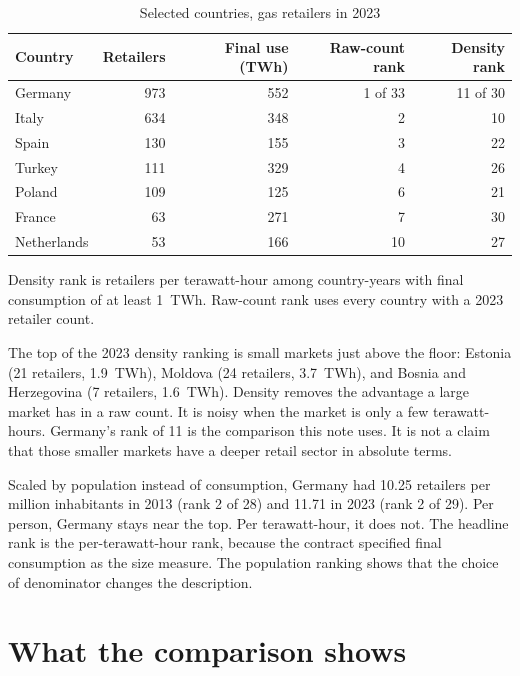 \documentclass[11pt,a4paper]{article}
\begin{document}
\begin{table}[ht]
\centering
\caption{Selected countries, gas retailers in 2023}
\label{tab:large}
\begin{tabular}{@{}lrrrr@{}}
\toprule
Country & Retailers & Final use (TWh) & Raw-count rank & Density rank \\
\midrule
Germany & 973 & 552 & 1 of 33 & 11 of 30 \\
Italy & 634 & 348 & 2 & 10 \\
Spain & 130 & 155 & 3 & 22 \\
Turkey & 111 & 329 & 4 & 26 \\
Poland & 109 & 125 & 6 & 21 \\
France & 63 & 271 & 7 & 30 \\
Netherlands & 53 & 166 & 10 & 27 \\
\bottomrule
\end{tabular}

\vspace{0.4em}
\begin{minipage}{0.92\textwidth}
\footnotesize
Density rank is retailers per terawatt-hour among country-years with final consumption of at least 1~TWh. Raw-count rank uses every country with a 2023 retailer count.
\end{minipage}
\end{table}

The top of the 2023 density ranking is small markets just above the floor: Estonia (21 retailers, 1.9~TWh), Moldova (24 retailers, 3.7~TWh), and Bosnia and Herzegovina (7 retailers, 1.6~TWh). Density removes the advantage a large market has in a raw count. It is noisy when the market is only a few terawatt-hours. Germany's rank of 11 is the comparison this note uses. It is not a claim that those smaller markets have a deeper retail sector in absolute terms.

Scaled by population instead of consumption, Germany had 10.25 retailers per million inhabitants in 2013 (rank 2 of 28) and 11.71 in 2023 (rank 2 of 29). Per person, Germany stays near the top. Per terawatt-hour, it does not. The headline rank is the per-terawatt-hour rank, because the contract specified final consumption as the size measure. The population ranking shows that the choice of denominator changes the description.

\section{What the comparison shows}
\end{document}
